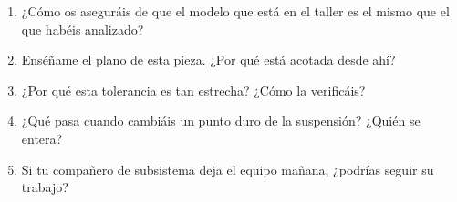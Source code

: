 \begin{juez}
\begin{enumerate}
  \item ¿Cómo os aseguráis de que el modelo que está en el taller es el mismo que
        el que habéis analizado?
  \item Enséñame el plano de esta pieza. ¿Por qué está acotada desde ahí?
  \item ¿Por qué esta tolerancia es tan estrecha? ¿Cómo la verificáis?
  \item ¿Qué pasa cuando cambiáis un punto duro de la suspensión? ¿Quién se entera?
  \item Si tu compañero de subsistema deja el equipo mañana, ¿podrías seguir su
        trabajo?
\end{enumerate}
\end{juez}

